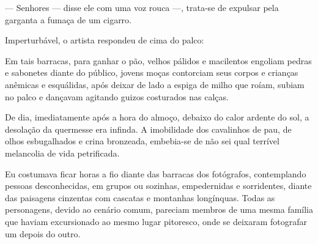 --- Senhores --- disse ele com uma voz rouca ---, trata-se de expulsar pela
    garganta a fumaça de um cigarro. 




Imperturbável, o artista respondeu de cima do palco:


Em tais barracas, para ganhar o pão, velhos pálidos e macilentos engoliam
pedras e sabonetes diante do público, jovens moças contorciam seus corpos e
crianças anêmicas e esquálidas, após deixar de lado a espiga de milho que
roíam, subiam no palco e dançavam agitando guizos costurados nas calças.

De dia, imediatamente após a hora do almoço, debaixo do calor ardente do sol,
a desolação da quermesse era infinda. A imobilidade dos cavalinhos de pau, de
olhos esbugalhados e crina bronzeada, embebia-se de não sei qual terrível
melancolia de vida petrificada. 

Eu costumava ficar horas a fio diante das barracas dos fotógrafos,
contemplando pessoas desconhecidas, em grupos ou sozinhas, empedernidas e
sorridentes, diante das paisagens cinzentas com cascatas e montanhas
longínquas. Todas as personagens, devido ao cenário comum, pareciam membros
de uma mesma família que haviam excursionado ao mesmo lugar pitoresco, onde
se deixaram fotografar um depois do outro.


